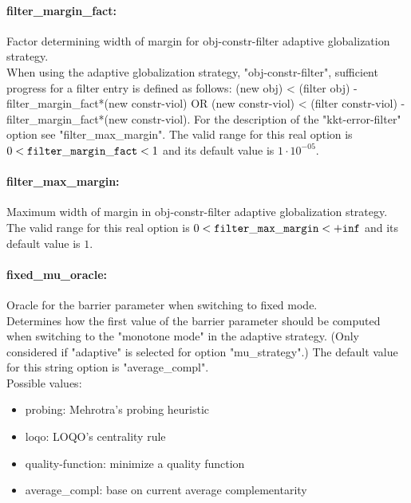 \paragraph{filter\_margin\_fact:}\label{sec:filter_margin_fact} Factor determining width of margin for obj-constr-filter adaptive globalization strategy. $\;$ \\
 When using the adaptive globalization strategy,
"obj-constr-filter", sufficient progress for a
filter entry is defined as follows: (new obj) <
(filter obj) - filter\_margin\_fact*(new
constr-viol) OR (new constr-viol) < (filter
constr-viol) - filter\_margin\_fact*(new
constr-viol).  For the description of the
"kkt-error-filter" option see
"filter\_max\_margin". The valid range for this real option is 
$0 <  {\tt filter\_margin\_fact } <  1$
and its default value is $1 \cdot 10^{-05}$.


\paragraph{filter\_max\_margin:}\label{sec:filter_max_margin} Maximum width of margin in obj-constr-filter adaptive globalization strategy. $\;$ \\
 The valid range for this real option is 
$0 <  {\tt filter\_max\_margin } <  {\tt +inf}$
and its default value is $1$.


\paragraph{fixed\_mu\_oracle:}\label{sec:fixed_mu_oracle} Oracle for the barrier parameter when switching to fixed mode. $\;$ \\
 Determines how the first value of the barrier
parameter should be computed when switching to
the "monotone mode" in the adaptive strategy.
(Only considered if "adaptive" is selected for
option "mu\_strategy".)
The default value for this string option is "average\_compl".
\\ 
Possible values:
\begin{itemize}
   \item probing: Mehrotra's probing heuristic
   \item loqo: LOQO's centrality rule
   \item quality-function: minimize a quality function
   \item average\_compl: base on current average complementarity
\end{itemize}

